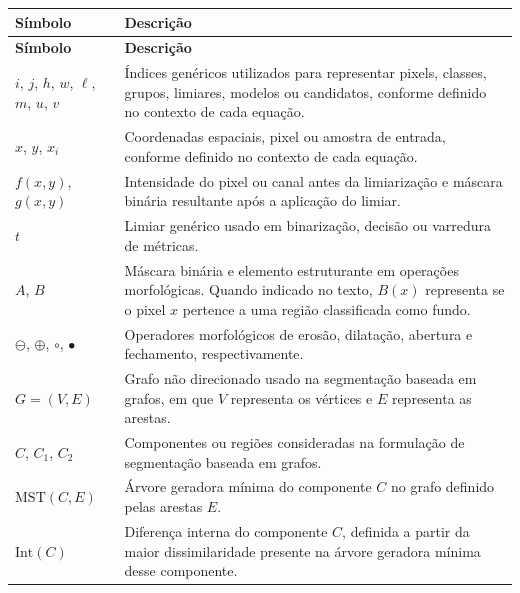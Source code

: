 
\begingroup
\renewcommand{\arraystretch}{1.15}
\begin{longtable}{p{3.0cm}p{12.0cm}}
  \textbf{Símbolo} & \textbf{Descrição}\\
  \hline
  \endfirsthead
  \textbf{Símbolo} & \textbf{Descrição}\\
  \hline
  \endhead

  $i$, $j$, $h$, $w$, $\ell$, $m$, $u$, $v$ &
  Índices genéricos utilizados para representar pixels, classes, grupos,
  limiares, modelos ou candidatos, conforme definido no contexto de cada equação.\\

  $x$, $y$, $x_i$ &
  Coordenadas espaciais, pixel ou amostra de entrada, conforme definido no contexto de
cada equação.\\

  $f(x,y)$, $g(x,y)$ &
  Intensidade do pixel ou canal antes da limiarização e máscara binária
  resultante após a aplicação do limiar.\\

  $t$ &
  Limiar genérico usado em binarização, decisão ou varredura de métricas.\\

  $A$, $B$ &
  Máscara binária e elemento estruturante em operações morfológicas. Quando
  indicado no texto, $B(x)$ representa se o pixel $x$ pertence a uma região
  classificada como fundo.\\

  $\ominus$, $\oplus$, $\circ$, $\bullet$ &
  Operadores morfológicos de erosão, dilatação, abertura e fechamento,
  respectivamente.\\

  $G=(V,E)$ &
  Grafo não direcionado usado na segmentação baseada em grafos, em que $V$
  representa os vértices e $E$ representa as arestas.\\

  $C$, $C_1$, $C_2$ &
  Componentes ou regiões consideradas na formulação de segmentação baseada em
  grafos.\\

  $\mathrm{MST}(C,E)$ &
  Árvore geradora mínima do componente $C$ no grafo definido pelas arestas $E$.\\

  $\mathrm{Int}(C)$ &
  Diferença interna do componente $C$, definida a partir da maior dissimilaridade
  presente na árvore geradora mínima desse componente.\\


\end{longtable}
